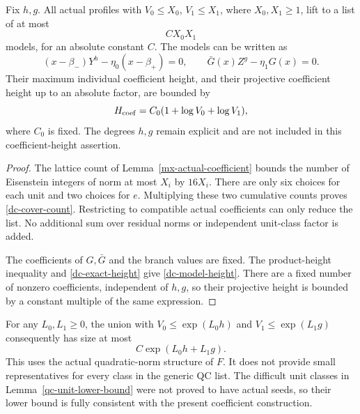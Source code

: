 \begin{theorem}\label{dc-count-height}
Fix $h,g$. All actual profiles with $V_0\le X_0$, $V_1\le X_1$,
where $X_0,X_1\ge1$, lift to a list of at most
\begin{equation}\label{dc-cover-count}
 CX_0X_1
\end{equation}
models, for an absolute constant $C$. The models can be written as
\begin{equation}\label{dc-polynomial-model}
 (x-\beta_-)Y^h-\eta_0(x-\beta_+)=0,\qquad
 \bar G(x)Z^g-\eta_1G(x)=0.
\end{equation}
Their maximum individual coefficient height, and their projective
coefficient height up to an absolute factor, are bounded by
\begin{equation}\label{dc-model-height}
 H_{\rm coef}=C_0(1+\log V_0+\log V_1),
\end{equation}
where $C_0$ is fixed. The degrees $h,g$ remain explicit and are
not included in this coefficient-height assertion.
\end{theorem}
\begin{proof}
The lattice count of Lemma~\ref{mx-actual-coefficient} bounds the
number of Eisenstein integers of norm at most $X_i$ by $16X_i$.
There are only six choices for each unit and two choices for $e$.
Multiplying these two cumulative counts proves
\eqref{dc-cover-count}. Restricting to compatible actual
coefficients can only reduce the list. No additional sum over
residual norms or independent unit-class factor is added.

The coefficients of $G,\bar G$ and the branch values are fixed.
The product-height inequality and \eqref{dc-exact-height} give
\eqref{dc-model-height}. There are a fixed number of nonzero
coefficients, independent of $h,g$, so their projective height
is bounded by a constant multiple of the same expression.
\end{proof}

For any $L_0,L_1\ge0$, the union with
$V_0\le\exp(L_0h)$ and $V_1\le\exp(L_1g)$ consequently has size
at most
\begin{equation}\label{dc-small-residual-count}
 C\exp(L_0h+L_1g).
\end{equation}
This uses the actual quadratic-norm structure of $F$. It does not
provide small representatives for every class in the generic QC
list. The difficult unit classes in Lemma~\ref{qc-unit-lower-bound}
were not proved to have actual seeds, so their lower bound is fully
consistent with the present coefficient construction.

